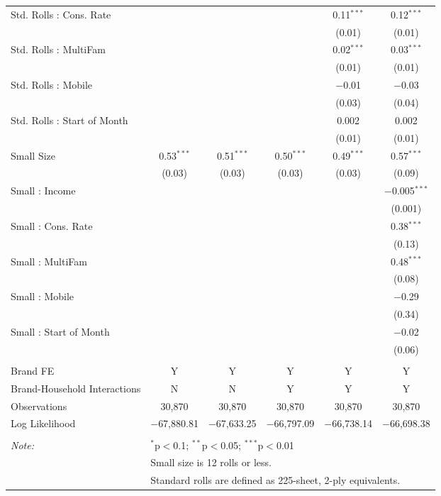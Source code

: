 \begin{table}[!htbp]
\begin{tabular}{@{\extracolsep{5pt}}lccccc}
  Std. Rolls : Cons. Rate &  &  &  & 0.11$^{***}$ & 0.12$^{***}$ \\ 
  &  &  &  & (0.01) & (0.01) \\ 
  Std. Rolls : MultiFam &  &  &  & 0.02$^{***}$ & 0.03$^{***}$ \\ 
  &  &  &  & (0.01) & (0.01) \\ 
  Std. Rolls : Mobile &  &  &  & $-$0.01 & $-$0.03 \\ 
  &  &  &  & (0.03) & (0.04) \\ 
  Std. Rolls : Start of Month &  &  &  & 0.002 & 0.002 \\ 
  &  &  &  & (0.01) & (0.01) \\ 
  Small Size & 0.53$^{***}$ & 0.51$^{***}$ & 0.50$^{***}$ & 0.49$^{***}$ & 0.57$^{***}$ \\ 
  & (0.03) & (0.03) & (0.03) & (0.03) & (0.09) \\ 
  Small : Income &  &  &  &  & $-$0.005$^{***}$ \\ 
  &  &  &  &  & (0.001) \\ 
  Small : Cons. Rate &  &  &  &  & 0.38$^{***}$ \\ 
  &  &  &  &  & (0.13) \\ 
  Small : MultiFam &  &  &  &  & 0.48$^{***}$ \\ 
  &  &  &  &  & (0.08) \\ 
  Small : Mobile &  &  &  &  & $-$0.29 \\ 
  &  &  &  &  & (0.34) \\ 
  Small : Start of Month &  &  &  &  & $-$0.02 \\ 
  &  &  &  &  & (0.06) \\ 
 \hline \\[-1.8ex] 
Brand FE & Y & Y & Y & Y & Y \\ 
Brand-Household Interactions & N & N & Y & Y & Y \\ 
Observations & 30,870 & 30,870 & 30,870 & 30,870 & 30,870 \\ 
Log Likelihood & $-$67,880.81 & $-$67,633.25 & $-$66,797.09 & $-$66,738.14 & $-$66,698.38 \\ 
\hline 
\hline \\[-1.8ex] 
\textit{Note:}  & \multicolumn{5}{l}{$^{*}$p$<$0.1; $^{**}$p$<$0.05; $^{***}$p$<$0.01} \\ 
 & \multicolumn{5}{l}{Small size is 12 rolls or less.} \\ 
 & \multicolumn{5}{l}{Standard rolls are defined as 225-sheet, 2-ply equivalents.} \\ 
\end{tabular} 
\end{table} 
